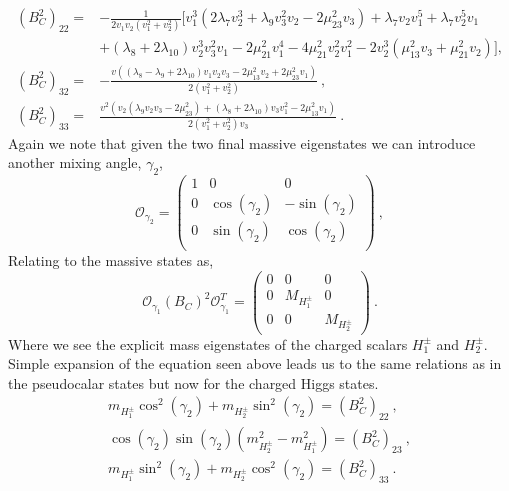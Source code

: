 \begin{equation}
\begin{split}
\left( B^2_C \right)_{22} = & -\frac{1}{2 v_1 v_2 \left(v_1^2+v_2^2\right)} \Bigg[ v_1^3 \left(2 \lambda _7 v_2^3+\lambda _9 v_3^2 v_2-2 \mu _{23}^2 v_3\right)+\lambda _7 v_2 v_1^5+\lambda _7 v_2^5 v_1 \\ & +\left(\lambda _8+2 \lambda _{10}\right) v_2^3 v_3^2 v_1-2 \mu _{21}^2 v_1^4-4 \mu _{21}^2 v_2^2 v_1^2-2 v_2^3 \left(\mu _{13}^2 v_3+\mu _{21}^2 v_2\right) \Bigg] ,  
%
\\
%
\left( B^2_C \right)_{32}  = &  -\frac{v \left(\left(\lambda _8-\lambda _9+2 \lambda _{10}\right) v_1 v_2 v_3-2 \mu _{13}^2 v_2+2 \mu _{23}^2 v_1\right)}{2 \left(v_1^2+v_2^2\right)} \ ,
%
\\
%
\left( B^2_C \right)_{33}  = & \frac{v^2 \left(v_2 \left(\lambda _9 v_2 v_3-2 \mu _{23}^2\right)+\left(\lambda _8+2 \lambda _{10}\right) v_3 v_1^2-2 \mu _{13}^2 v_1\right)}{2 \left(v_1^2+v_2^2\right) v_3} \ . 
%
\end{split} 
\end{equation}
Again we note that given the two final massive eigenstates we can introduce another mixing angle, $\gamma_2$, 
%
\begin{equation}
\mathcal{O}_{\gamma_2} = \begin{pmatrix}
1 & 0 & 0 \\
0 & \cos(\gamma_2) & -\sin(\gamma_2) \\ 
0 & \sin(\gamma_2) & \cos(\gamma_2) \\
\end{pmatrix} \ ,
\end{equation}
Relating to the massive states as, 
\begin{equation}
\mathcal{O}_{\gamma_1} \left( B_C \right)^2 \mathcal{O}_{\gamma_1}^T   = \begin{pmatrix}
0 & 0 & 0 \\ 
0 & M_{H_1^\pm} & 0 \\ 
0 & 0 & M_{H_2^\pm}  
\end{pmatrix} \ .
\end{equation}
%
Where we see the explicit mass eigenstates of the charged scalars $H^\pm_1$ and $H^\pm_2$. 
%
Simple expansion of the equation seen above leads us to the same relations as in the pseudocalar states but now for the charged Higgs states. 
\begin{equation}
\begin{split}
m_{H^\pm_1} \cos^2(\gamma_2) + m_{H^\pm_2}  \sin^2(\gamma_2) = \left( B_C^2 \right)_{22}  \ ,   \\
\cos(\gamma_2)\sin(\gamma_2)( m_{H^\pm_2}^2 - m_{H^\pm_1}^2  )  = \left( B_C^2 \right)_{23} \ , \\ 
m_{H^\pm_1} \sin^2(\gamma_2) + m_{H^\pm_2}  \cos^2(\gamma_2) = \left( B_C^2 \right)_{33} \ . 
\end{split} 
\end{equation}
